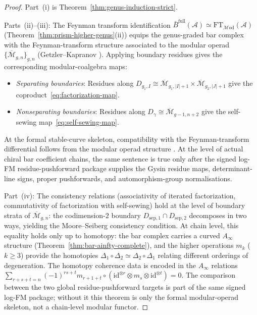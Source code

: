 \begin{proof}
Part~(i) is Theorem~\ref{thm:genus-induction-strict}.

Parts~(ii)--(iii): The Feynman transform identification
$\bar{B}^{\mathrm{full}}(\mathcal{A}) \simeq
\mathrm{FT}_{\mathcal{M}\mathrm{od}}(\mathcal{A})$
(Theorem~\ref{thm:prism-higher-genus}(ii)) equips the genus-graded
bar complex with the Feynman-transform structure associated to the
modular operad $\{\overline{\mathcal{M}}_{g,n}\}_{g,n}$
(Getzler--Kapranov \cite{GeK98}). Applying boundary residues gives
the corresponding modular-coalgebra maps:
\begin{itemize}
\item \emph{Separating boundaries}: Residues along
 $D_{g_1,I} \cong \overline{\mathcal{M}}_{g_1,|I|+1}
 \times \overline{\mathcal{M}}_{g_2,|J|+1}$ give the
 coproduct~\eqref{eq:factorization-map}.
\item \emph{Nonseparating boundaries}: Residues along
 $D_\gamma \cong \overline{\mathcal{M}}_{g-1,n+2}$ give the
 self-sewing map~\eqref{eq:self-sewing-map}.
\end{itemize}
At the formal stable-curve skeleton, compatibility with the
Feynman-transform differential follows from the modular operad
structure \cite[Theorem~5.4]{GeK98}.  At the level of actual chiral
bar coefficient chains, the same sentence is true only after the
signed log-FM residue-pushforward package supplies the Gysin residue
maps, determinant-line signs, proper pushforwards, and
automorphism-group normalisations.

Part~(iv): The consistency relations (associativity of
iterated factorization, commutativity of factorization with
self-sewing) hold at the level of boundary strata of
$\overline{\mathcal{M}}_{g,n}$: the codimension-$2$ boundary
$D_{\mathrm{sep},1} \cap D_{\mathrm{sep},2}$ decomposes in two
ways, yielding the Moore--Seiberg consistency condition. At chain
level, this equality holds only up to homotopy: the bar complex
carries a curved $A_\infty$ structure
(Theorem~\ref{thm:bar-ainfty-complete}), and the higher
operations $m_k$ ($k \geq 3$) provide the homotopies
$\Delta_1 \circ \Delta_2 \simeq \Delta_2 \circ \Delta_1$
relating different orderings of degeneration. The homotopy
coherence data is encoded in the $A_\infty$ relations
$\sum_{r+s+t=n} (-1)^{rs+t} m_{r+1+t} \circ
(\mathrm{id}^{\otimes r} \otimes m_s \otimes
\mathrm{id}^{\otimes t}) = 0$.  The comparison between the two
global residue-pushforward targets is part of the same signed log-FM
package; without it this theorem is only the formal modular-operad
skeleton, not a chain-level modular functor.
\end{proof}

